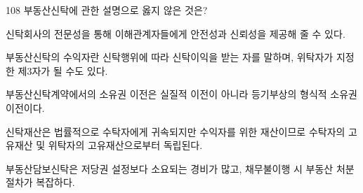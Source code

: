 \begin{question}{108}
부동산신탁에 관한 설명으로 옳지 않은 것은?
\begin{choices}
  \item 신탁회사의 전문성을 통해 이해관계자들에게 안전성과 신뢰성을 제공해 줄 수 있다.
  \item 부동산신탁의 수익자란 신탁행위에 따라 신탁이익을 받는 자를 말하며, 위탁자가 지정한 제3자가 될 수도 있다.
  \item 부동산신탁계약에서의 소유권 이전은 실질적 이전이 아니라 등기부상의 형식적 소유권 이전이다.
  \item 신탁재산은 법률적으로 수탁자에게 귀속되지만 수익자를 위한 재산이므로 수탁자의 고유재산 및 위탁자의 고유재산으로부터 독립된다.
  \item 부동산담보신탁은 저당권 설정보다 소요되는 경비가 많고, 채무불이행 시 부동산 처분 절차가 복잡하다.
\end{choices}
\end{question}
